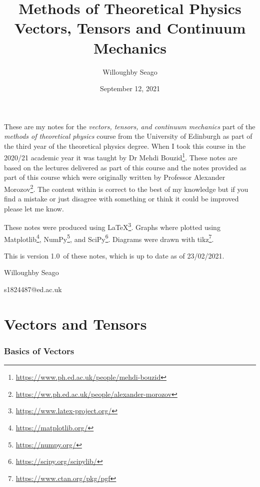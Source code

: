 \documentclass[a4paper]{article}
\author{Willoughby Seago}
\date{September 12, 2021}
\title{
    Methods of Theoretical Physics\\
    {\Large Vectors, Tensors and Continuum Mechanics}
}
\newcommand{\notesVersion}{1.0}
\newcommand{\notesDate}{23/02/2021}
\begin{document}
    \maketitle
    These are my notes for the \textit{vectors, tensors, and continuum mechanics} part of the \textit{methods of theoretical physics} course from the University of Edinburgh as part of the third year of the theoretical physics degree.
    When I took this course in the 2020/21 academic year it was taught by Dr Mehdi Bouzid\footnote{\url{https://www.ph.ed.ac.uk/people/mehdi-bouzid}}.
    These notes are based on the lectures delivered as part of this course and the notes provided as part of this course which were originally written by Professor Alexander Morozov\footnote{\url{https://ww.ph.ed.ac.uk/people/alexander-morozov}}.
    The content within is correct to the best of my knowledge but if you find a mistake or just disagree with something or think it could be improved please let me know.
    
    These notes were produced using \LaTeX\footnote{\url{https://www.latex-project.org/}}.
    Graphs where plotted using Matplotlib\footnote{\url{https://matplotlib.org/}}, NumPy\footnote{\url{https://numpy.org/}}, and SciPy\footnote{\url{https://scipy.org/scipylib/}}.
    Diagrams were drawn with tikz\footnote{\url{https://www.ctan.org/pkg/pgf}}.
    
    This is version \notesVersion~of these notes, which is up to date as of \notesDate.
    \begin{flushright}
        Willoughby Seago
        
        s1824487@ed.ac.uk
    \end{flushright}
    \clearpage
    \tableofcontents
    \printglossary[type=\acronymtype, title=Acronyms]
    \clearpage
    \begingroup
    \let\clearpage\relax  %
    \endgroup
    \part{Vectors and Tensors}
    \section{Basics of Vectors}
\end{document}
